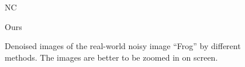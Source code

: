 \begin{figure}[t!]
{\begin{minipage}[t]{0.19\textwidth}
{\footnotesize NC}
\end{minipage}
\begin{minipage}[t]{0.19\textwidth}
\centering
{}
{\footnotesize Ours}
\end{minipage}
}\vspace{-3mm}
\caption{Denoised images of the real-world noisy image ``Frog'' \cite{ncwebsite} by different methods. The images are better to be zoomed in on screen.}
    \label{fig3-10}
\end{figure}

